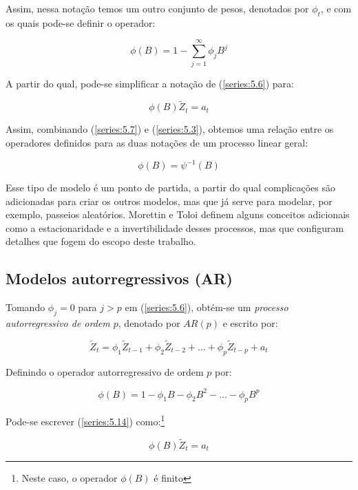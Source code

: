 Assim, nessa notação temos um outro conjunto de pesos, denotados por $\phi_t$, e com os quais pode-se definir o operador:

\begin{equation}\label{series:5.8}
\phi(B) = 1 - \sum_{j=1}^\infty \phi_j B^j
\end{equation}

A partir do qual, pode-se simplificar a notação de (\ref{series:5.6}) para:

\begin{equation}\label{series:5.7}
\phi(B)\tilde{Z}_t = a_t
\end{equation}

Assim, combinando (\ref{series:5.7}) e (\ref{series:5.3}), obtemos uma relação entre os operadores definidos para as duas notações de um processo linear geral:

\begin{equation}\label{series:5.9}
\phi(B) = \psi^{-1}(B)
\end{equation}

Esse tipo de modelo é um ponto de partida, a partir do qual complicações são adicionadas para criar os outros modelos, mas que já serve para modelar, por exemplo, passeios aleatórios. Morettin e Toloi \citep{morettin} definem alguns conceitos adicionais como a estacionaridade e a invertibilidade desses processos, mas que configuram detalhes que fogem do escopo deste trabalho.


\subsection{Modelos autorregressivos (AR)}

Tomando $\phi_j = 0$ para $j > p$ em (\ref{series:5.6}), obtém-se um \emph{processo autorregressivo de ordem $p$}, denotado por $AR(p)$ e escrito por:

\begin{equation}\label{series:5.14}
\tilde{Z}_t = \phi_1 \tilde{Z}_{t-1} + \phi_2 \tilde{Z}_{t-2} + \ldots + \phi_p \tilde{Z}_{t-p} + a_t
\end{equation}

Definindo o operador autorregressivo de ordem $p$ por:

\[
\phi(B) = 1 - \phi_1 B - \phi_2 B^2 - \ldots - \phi_p B^p
\]

Pode-se escrever (\ref{series:5.14}) como:\footnote{Neste caso, o operador $\phi(B)$ é finito}

\begin{equation}\label{series:5.16}
\phi(B)\tilde{Z}_t = a_t
\end{equation}

